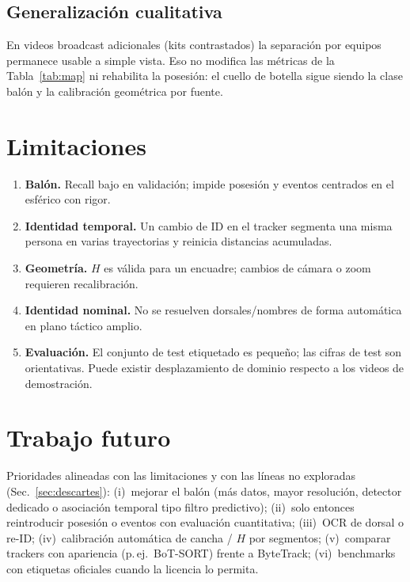 \documentclass[conference]{IEEEtran}
\begin{document}
\subsection{Generalización cualitativa}
En videos broadcast adicionales (kits contrastados) la separación por equipos permanece usable a simple vista. Eso no modifica las métricas de la Tabla~\ref{tab:map} ni rehabilita la posesión: el cuello de botella sigue siendo la clase balón y la calibración geométrica por fuente.

\section{Limitaciones}
\label{sec:limitaciones}

\begin{enumerate}[leftmargin=*,itemsep=2pt]
  \item \textbf{Balón.} Recall bajo en validación; impide posesión y eventos centrados en el esférico con rigor.
  \item \textbf{Identidad temporal.} Un cambio de ID en el tracker segmenta una misma persona en varias trayectorias y reinicia distancias acumuladas.
  \item \textbf{Geometría.} $H$ es válida para un encuadre; cambios de cámara o zoom requieren recalibración.
  \item \textbf{Identidad nominal.} No se resuelven dorsales/nombres de forma automática en plano táctico amplio.
  \item \textbf{Evaluación.} El conjunto de test etiquetado es pequeño; las cifras de test son orientativas. Puede existir desplazamiento de dominio respecto a los videos de demostración.
\end{enumerate}

\section{Trabajo futuro}
\label{sec:futuro}

Prioridades alineadas con las limitaciones y con las líneas no exploradas (Sec.~\ref{sec:descartes}): (i)~mejorar el balón (más datos, mayor resolución, detector dedicado o asociación temporal tipo filtro predictivo); (ii)~solo entonces reintroducir posesión o eventos con evaluación cuantitativa; (iii)~OCR de dorsal o re-ID; (iv)~calibración automática de cancha / $H$ por segmentos; (v)~comparar trackers con apariencia (p.\,ej.\ BoT-SORT) frente a ByteTrack; (vi)~benchmarks con etiquetas oficiales cuando la licencia lo permita.
\end{document}
